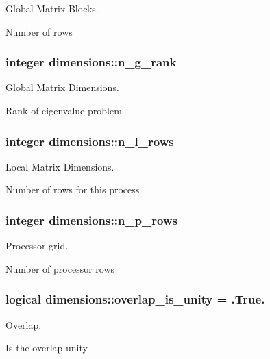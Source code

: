 Global Matrix Blocks. 

Number of rows \hypertarget{namespacedimensions_a9376ca9c441df4fbb42e61ae24871472}{}
\subsubsection[{n\+\_\+g\+\_\+rank}]{\setlength{\rightskip}{0pt plus 5cm}integer dimensions\+::n\+\_\+g\+\_\+rank}\label{namespacedimensions_a9376ca9c441df4fbb42e61ae24871472}


Global Matrix Dimensions. 

Rank of eigenvalue problem \hypertarget{namespacedimensions_a910d07df719e9e944e11513f92f923f5}{}
\subsubsection[{n\+\_\+l\+\_\+rows}]{\setlength{\rightskip}{0pt plus 5cm}integer dimensions\+::n\+\_\+l\+\_\+rows}\label{namespacedimensions_a910d07df719e9e944e11513f92f923f5}


Local Matrix Dimensions. 

Number of rows for this process \hypertarget{namespacedimensions_a397d214568d37d3ec2483b2779dcfee0}{}
\subsubsection[{n\+\_\+p\+\_\+rows}]{\setlength{\rightskip}{0pt plus 5cm}integer dimensions\+::n\+\_\+p\+\_\+rows}\label{namespacedimensions_a397d214568d37d3ec2483b2779dcfee0}


Processor grid. 

Number of processor rows \hypertarget{namespacedimensions_a93911be2b2a6f6b0dda974846dbf5973}{}
\subsubsection[{overlap\+\_\+is\+\_\+unity}]{\setlength{\rightskip}{0pt plus 5cm}logical dimensions\+::overlap\+\_\+is\+\_\+unity = .True.}\label{namespacedimensions_a93911be2b2a6f6b0dda974846dbf5973}


Overlap. 

Is the overlap unity 